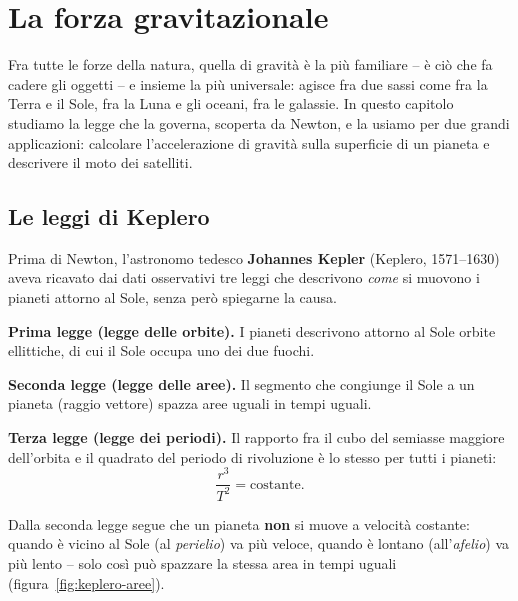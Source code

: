 \chapter{La forza gravitazionale}

Fra tutte le forze della natura, quella di gravità è la più familiare -- è ciò che fa cadere gli oggetti -- e insieme la più universale: agisce fra due sassi come fra la Terra e il Sole, fra la Luna e gli oceani, fra le galassie. In questo capitolo studiamo la legge che la governa, scoperta da Newton, e la usiamo per due grandi applicazioni: calcolare l'accelerazione di gravità sulla superficie di un pianeta e descrivere il moto dei satelliti.

\section{Le leggi di Keplero}

Prima di Newton, l'astronomo tedesco \textbf{Johannes Kepler} (Keplero, 1571--1630) aveva ricavato dai dati osservativi tre leggi che descrivono \emph{come} si muovono i pianeti attorno al Sole, senza però spiegarne la causa.

\begin{definizione}
\textbf{Prima legge (legge delle orbite).} I pianeti descrivono attorno al Sole orbite ellittiche, di cui il Sole occupa uno dei due fuochi.

\textbf{Seconda legge (legge delle aree).} Il segmento che congiunge il Sole a un pianeta (raggio vettore) spazza aree uguali in tempi uguali.

\textbf{Terza legge (legge dei periodi).} Il rapporto fra il cubo del semiasse maggiore dell'orbita e il quadrato del periodo di rivoluzione è lo stesso per tutti i pianeti:
\[ \frac{r^3}{T^2} = \text{costante}. \]
\end{definizione}

Dalla seconda legge segue che un pianeta \textbf{non} si muove a velocità costante: quando è vicino al Sole (al \emph{perielio}) va più veloce, quando è lontano (all'\emph{afelio}) va più lento -- solo così può spazzare la stessa area in tempi uguali (figura~\ref{fig:keplero-aree}).

